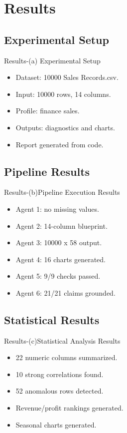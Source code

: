 \documentclass[10pt,aspectratio=43]{beamer}
\begin{document}
\section{Results}
\subsection{Experimental Setup}
\begin{frame}{Results-(a) Experimental Setup}
\begin{itemize}
  \item Dataset: 10000 Sales Records.csv.
  \item Input: 10000 rows, 14 columns.
  \item Profile: finance sales.
  \item Outputs: diagnostics and charts.
  \item Report generated from code.
\end{itemize}
\end{frame}

\subsection{Pipeline Results}
\begin{frame}{Results-(b)Pipeline Execution Results}
\begin{itemize}
  \item Agent 1: no missing values.
  \item Agent 2: 14-column blueprint.
  \item Agent 3: 10000 x 58 output.
  \item Agent 4: 16 charts generated.
  \item Agent 5: 9/9 checks passed.
  \item Agent 6: 21/21 claims grounded.
\end{itemize}
\end{frame}

\subsection{Statistical Results}
\begin{frame}{Results-(c)Statistical Analysis Results}
\begin{itemize}
  \item 22 numeric columns summarized.
  \item 10 strong correlations found.
  \item 52 anomalous rows detected.
  \item Revenue/profit rankings generated.
  \item Seasonal charts generated.
\end{itemize}
\end{frame}
\end{document}
